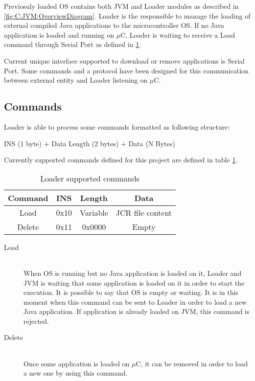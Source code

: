 Previosuly loaded OS contains both JVM and Loader modules as described in \ref{fig:C:JVM:OverviewDiagram}. Loader is the responsible to manage the loading of external compiled Java applications to the microcontroller OS. If no Java application is loaded and running on $\mu$C, Loader is waiting to receive a Load command through Serial Port as defined in \ref{tab:SS:JVM:Loader:Commands}.

Current unique interface supported to download or remove applications is Serial Port. Some commands and a protocol have been designed for this communication between external entity and Loader listening on $\mu$C.

\subsection{Commands}\label{SS:JVM:Loader:Commands}
Loader is able to process some commands formatted as following structure:

\begin{center}
INS (1 byte) + Data Length (2 bytes) + Data (N Bytes)
\end{center}

Currently supported commands defined for this project are defined in table \ref{tab:SS:JVM:Loader:Commands}.

\begin{table}[!htb]
\centering
\begin{tabular}{|c|c|c|c|}
\hline 
Command & INS & Length & Data \\ 
\hline 
Load & 0x10 & Variable & JCR file content \\ 
\hline 
Delete & 0x11 & 0x0000 & Empty \\ 
\hline 
\end{tabular}
\caption{Loader supported commands}
\label{tab:SS:JVM:Loader:Commands}
\end{table}

\begin{description}
\item[Load] \hfill \\
When OS is running but no Java application is loaded on it, Loader and JVM is waiting that some application is loaded on it in order to start the execution. It is possible to say that OS is empty or waiting. It is in this moment when this command can be sent to Loader in order to load a new Java application. If application is already loaded on JVM, this command is rejected.
\item[Delete] \hfill \\
Once some application is loaded on $\mu$C, it can be removed in order to load a new one by using this command.
\end{description}

